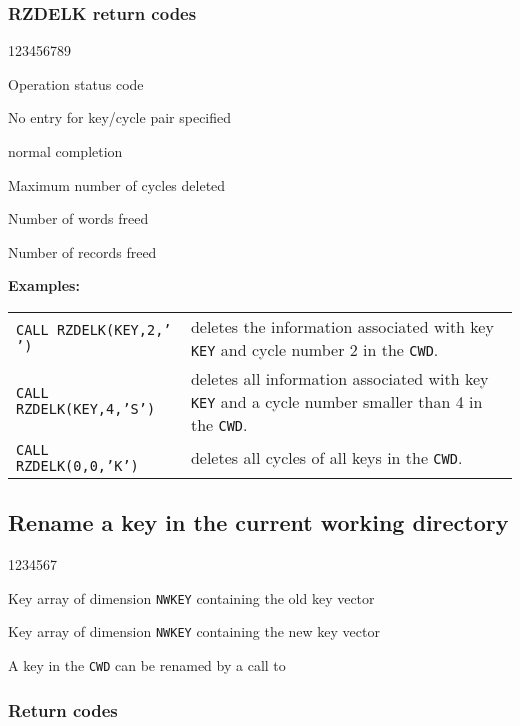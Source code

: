 \subsubsection*{RZDELK return codes}
\begin{DLtt}{123456789}
\item[IQUEST(1)]Operation status code
\begin{DLtt}{1}
\item[1]No entry for key/cycle pair specified
\item[0]normal completion
\end{DLtt}
\item[IQUEST(11)]Maximum number of cycles deleted
\item[IQUEST(12)]Number of words freed
\item[IQUEST(13)]Number of records freed
\end{DLtt}
{\bf Examples:}\quad
\begin{tabular}[t]{>{\tt}l@{\qquad}p{}}
CALL RZDELK(KEY,2,' ')      & 
deletes the information associated with key {\tt KEY} 
and cycle number 2 in the {\tt CWD}.                      \\[2mm]
CALL RZDELK(KEY,4,'S')      & 
deletes all information associated with key {\tt KEY}
and a cycle number smaller than 4 in the {\tt CWD}.       \\[2mm]
CALL RZDELK(0,0,'K')        &
deletes all cycles of all keys in the {\tt CWD}.
\end{tabular}


\subsection{Rename a key in the current working directory}

\begin{DLtt}{1234567}
\item[KEYOLD]Key array of dimension {\tt NWKEY} containing the old key vector
\item[KEYNEW]Key array of dimension {\tt NWKEY} containing the new key vector
\end{DLtt}

A key in the {\tt CWD} can be renamed by a call to 

\subsubsection*{Return codes}

